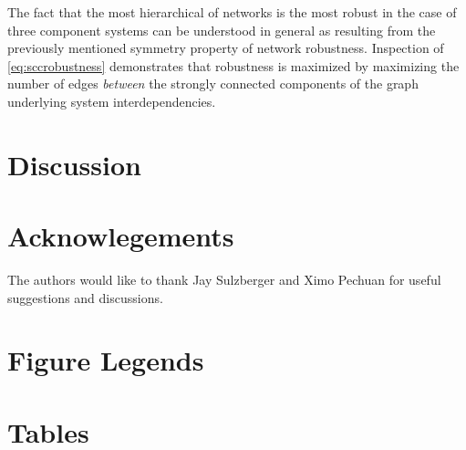 The fact that the most hierarchical of networks is the most robust in the case of three component systems can be understood in general as resulting from the previously mentioned symmetry property of network robustness. Inspection of \ref{eq:sccrobustness} demonstrates that robustness is maximized by maximizing the number of edges \emph{between} the strongly connected components of the graph underlying system interdependencies.

\section{Discussion}

\section{Acknowlegements}  The authors would like to thank Jay Sulzberger and Ximo Pechuan for useful suggestions and discussions.

\newpage




\newpage
\FloatBarrier

\section{Figure Legends}


\newpage
\FloatBarrier

\section{Tables}





% 

